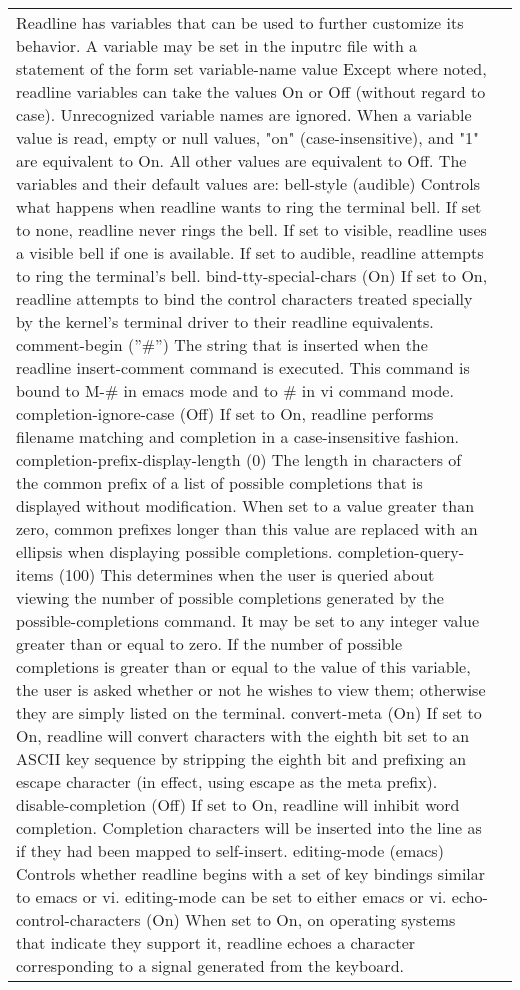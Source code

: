 \documentclass[11pt]{article}
\begin{document}
\begin{longtable}{p{}p{}}
{{{Readline has variables that can be used to further customize its behavior. A variable may be set in the inputrc file with a statement of the form
set variable-name value
Except where noted, readline variables can take the values On or Off (without regard to case). Unrecognized variable names are ignored. When a variable value is read, empty or null values, "on" (case-insensitive), and "1" are equivalent to On. All other values are equivalent to Off. The variables and their default values are:
bell-style (audible)
Controls what happens when readline wants to ring the terminal bell. If set to none, readline never rings the bell. If set to visible, readline uses a visible bell if one is available. If set to audible, readline attempts to ring the terminal's bell.
bind-tty-special-chars (On)
If set to On, readline attempts to bind the control characters treated specially by the kernel's terminal driver to their readline equivalents.
comment-begin (''#'')
The string that is inserted when the readline insert-comment command is executed. This command is bound to M-# in emacs mode and to # in vi command mode.
completion-ignore-case (Off)
If set to On, readline performs filename matching and completion in a case-insensitive fashion.
completion-prefix-display-length (0)
The length in characters of the common prefix of a list of possible completions that is displayed without modification. When set to a value greater than zero, common prefixes longer than this value are replaced with an ellipsis when displaying possible completions.
completion-query-items (100)
This determines when the user is queried about viewing the number of possible completions generated by the possible-completions command. It may be set to any integer value greater than or equal to zero. If the number of possible completions is greater than or equal to the value of this variable, the user is asked whether or not he wishes to view them; otherwise they are simply listed on the terminal.
convert-meta (On)
If set to On, readline will convert characters with the eighth bit set to an ASCII key sequence by stripping the eighth bit and prefixing an escape character (in effect, using escape as the meta prefix).
disable-completion (Off)
If set to On, readline will inhibit word completion. Completion characters will be inserted into the line as if they had been mapped to self-insert.
editing-mode (emacs)
Controls whether readline begins with a set of key bindings similar to emacs or vi. editing-mode can be set to either emacs or vi.
echo-control-characters (On)
When set to On, on operating systems that indicate they support it, readline echoes a character corresponding to a signal generated from the keyboard.
}}}
\end{longtable}
\end{document}
